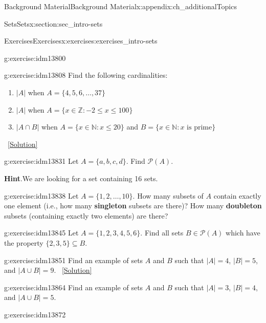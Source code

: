 \documentclass[oneside,10pt,]{book}
\newcommand{\terminology}[1]{\textbf{#1}}
\numberwithin{equation}{chapter}
\def\N{\mathbb N}
\def\Z{\mathbb Z}
\def\pow{\mathcal P}
\def\st{:}
\begin{document}
\begin{appendixptx}{Background Material}{}{Background Material}{}{}{x:appendix:ch_additionalTopics}
\begin{sectionptx}{Sets}{}{Sets}{}{}{x:section:sec_intro-sets}
\begin{exercises-subsection}{Exercises}{}{Exercises}{}{}{x:exercises:exercises_intro-sets}
\begin{divisionexercise}{8}{}{}{g:exercise:idm13800}
\begin{sidebyside}{1}{0.4}{0.4}{0}
\begin{sbspanel}{0.2}
{\begin{tikzpicture}[fill=gray!50, scale=0.5]
\end{tikzpicture}
}%
\end{sbspanel}%
\end{sidebyside}%
\end{divisionexercise}%
\begin{divisionexercise}{9}{}{}{g:exercise:idm13808}%
Find the following cardinalities:%
\begin{enumerate}[label=(\alph*)]
\item{}\(|A|\) when \(A = \{4,5,6,\ldots,37\}\)%
\item{}\(|A|\) when \(A = \{x \in \Z \st -2 \le x \le 100\}\)%
\item{}\(|A \cap B|\) when \(A = \{x \in \N \st x \le 20\}\) and \(B = \{x \in \N \st x \mbox{ is prime} \}\)%
\end{enumerate}
%
\qquad~\hfill{\tiny\hyperlink{g:solution:idm13822-main}{[Solution]}}\end{divisionexercise}%
\begin{divisionexercise}{10}{}{}{g:exercise:idm13831}%
Let \(A = \{a, b, c, d\}\). Find \(\pow(A)\).%
\par\smallskip%
\noindent\textbf{Hint}.\hypertarget{g:hint:idm13836}{}\quad{}We are looking for a set containing 16 sets.%
\end{divisionexercise}%
\begin{divisionexercise}{11}{}{}{g:exercise:idm13838}%
Let \(A = \{1,2,\ldots, 10\}\). How many subsets of \(A\) contain exactly one element (i.e., how many \terminology{singleton} subsets are there)? How many \terminology{doubleton} subsets (containing exactly two elements) are there?%
\end{divisionexercise}%
\begin{divisionexercise}{12}{}{}{g:exercise:idm13845}%
Let \(A = \{1,2,3,4,5,6\}\). Find all sets \(B \in \pow(A)\) which have the property \(\{2,3,5\} \subseteq B\).%
\end{divisionexercise}%
\begin{divisionexercise}{13}{}{}{g:exercise:idm13851}%
Find an example of sets \(A\) and \(B\) such that \(|A| = 4\), \(|B| = 5\), and \(|A \cup B| = 9\).%
\qquad~\hfill{\tiny\hyperlink{g:solution:idm13859-main}{[Solution]}}\end{divisionexercise}%
\begin{divisionexercise}{14}{}{}{g:exercise:idm13864}%
Find an example of sets \(A\) and \(B\) such that \(|A| = 3\), \(|B| = 4\), and \(|A \cup B| = 5\).%
\end{divisionexercise}%
\begin{divisionexercise}{15}{}{}{g:exercise:idm13872}%

\end{divisionexercise}
\end{exercises-subsection}
\end{sectionptx}
\end{appendixptx}
\end{document}
